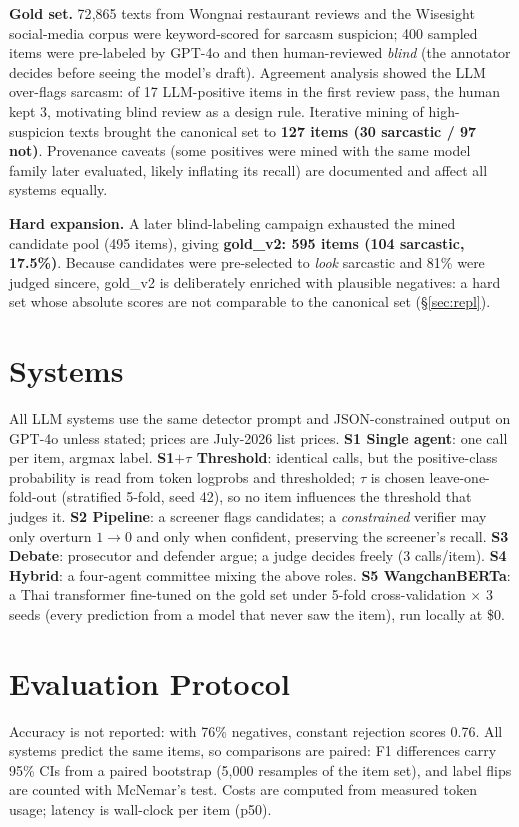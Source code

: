 \documentclass[10pt]{article}
\begin{document}
\textbf{Gold set.} 72{,}865 texts from Wongnai restaurant reviews and the Wisesight social-media
corpus were keyword-scored for sarcasm suspicion; 400 sampled items were pre-labeled by GPT-4o and
then human-reviewed \emph{blind} (the annotator decides before seeing the model's draft). Agreement
analysis showed the LLM over-flags sarcasm: of 17 LLM-positive items in the first review pass, the
human kept 3, motivating blind review as a design rule. Iterative mining of high-suspicion texts
brought the canonical set to \textbf{127 items (30 sarcastic / 97 not)}. Provenance caveats (some
positives were mined with the same model family later evaluated, likely inflating its recall) are
documented and affect all systems equally.

\textbf{Hard expansion.} A later blind-labeling campaign exhausted the mined candidate pool
(495 items), giving \textbf{gold\_v2: 595 items (104 sarcastic, 17.5\%)}. Because candidates were
pre-selected to \emph{look} sarcastic and 81\% were judged sincere, gold\_v2 is deliberately
enriched with plausible negatives: a hard set whose absolute scores are not comparable to the
canonical set (\S\ref{sec:repl}).

\section{Systems}
All LLM systems use the same detector prompt and JSON-constrained output on GPT-4o unless stated;
prices are July-2026 list prices.
\textbf{S1 Single agent}: one call per item, argmax label.
\textbf{S1$+\tau$ Threshold}: identical calls, but the positive-class probability is read from token
logprobs and thresholded; $\tau$ is chosen leave-one-fold-out (stratified 5-fold, seed 42), so no
item influences the threshold that judges it.
\textbf{S2 Pipeline}: a screener flags candidates; a \emph{constrained} verifier may only overturn
$1\to0$ and only when confident, preserving the screener's recall.
\textbf{S3 Debate}: prosecutor and defender argue; a judge decides freely (3 calls/item).
\textbf{S4 Hybrid}: a four-agent committee mixing the above roles.
\textbf{S5 WangchanBERTa}: a Thai transformer fine-tuned on the gold set under 5-fold
cross-validation $\times$ 3 seeds (every prediction from a model that never saw the item), run
locally at \$0.

\section{Evaluation Protocol}
Accuracy is not reported: with 76\% negatives, constant rejection scores 0.76. All systems predict
the same items, so comparisons are paired: F1 differences carry 95\% CIs from a paired bootstrap
(5{,}000 resamples of the item set), and label flips are counted with McNemar's test. Costs are
computed from measured token usage; latency is wall-clock per item (p50).
\end{document}
